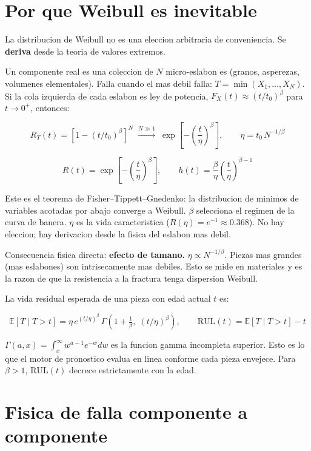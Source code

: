 \documentclass[10.5pt,a4paper]{article}
\begin{document}
\section{Por que Weibull es inevitable}

La distribucion de Weibull no es una eleccion arbitraria de conveniencia. Se \textbf{deriva} desde la teoria de valores extremos.

Un componente real es una coleccion de $N$ micro-eslabon es (granos, asperezas, volumenes elementales). Falla cuando el mas debil falla: $T = \min(X_1, \dots, X_N)$. Si la cola izquierda de cada eslabon es ley de potencia, $F_X(t) \approx (t/t_0)^\beta$ para $t \to 0^+$, entonces:

$$R_T(t) = [1 - (t/t_0)^\beta]^N \;\xrightarrow{N \gg 1}\; \exp\!\left[-\left(\frac{t}{\eta}\right)^\beta\right], \qquad \eta = t_0\,N^{-1/\beta}$$

\begin{mathbox}
$$R(t) = \exp\!\left[-\left(\frac{t}{\eta}\right)^\beta\right], \qquad h(t) = \frac{\beta}{\eta}\left(\frac{t}{\eta}\right)^{\beta-1}$$

Este es el teorema de Fisher--Tippett--Gnedenko: la distribucion de minimos de variables acotadas por abajo converge a Weibull. $\beta$ selecciona el regimen de la curva de banera. $\eta$ es la vida caracteristica ($R(\eta) = e^{-1} \approx 0.368$). No hay eleccion; hay derivacion desde la fisica del eslabon mas debil.
\end{mathbox}

Consecuencia fisica directa: \textbf{efecto de tamano.} $\eta \propto N^{-1/\beta}$. Piezas mas grandes (mas eslabones) son intrisecamente mas debiles. Esto se mide en materiales y es la razon de que la resistencia a la fractura tenga dispersion Weibull.

La vida residual esperada de una pieza con edad actual $t$ es:
\begin{mathbox}
$$\mathbb{E}[T \mid T>t] = \eta\, e^{(t/\eta)^\beta}\,\Gamma\!\left(1+\tfrac{1}{\beta},\; (t/\eta)^\beta\right), \qquad \mathrm{RUL}(t) = \mathbb{E}[T\mid T>t] - t$$

$\Gamma(a,x) = \int_x^\infty w^{a-1}e^{-w}dw$ es la funcion gamma incompleta superior. Esto es lo que el motor de pronostico evalua en linea conforme cada pieza envejece. Para $\beta > 1$, $\mathrm{RUL}(t)$ decrece estrictamente con la edad.
\end{mathbox}

\section{Fisica de falla componente a componente}
\end{document}
